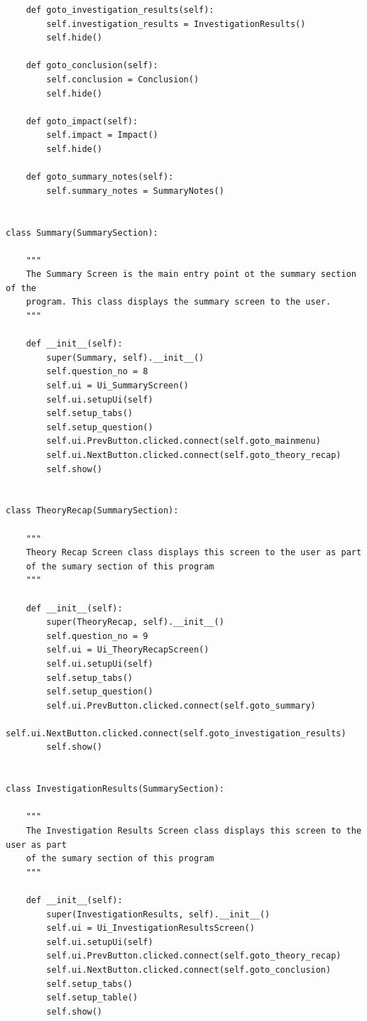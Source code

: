 \documentclass{article}
\begin{document}
\begin{lstlisting}
    def goto_investigation_results(self):
        self.investigation_results = InvestigationResults()
        self.hide()

    def goto_conclusion(self):
        self.conclusion = Conclusion()
        self.hide()

    def goto_impact(self):
        self.impact = Impact()
        self.hide()

    def goto_summary_notes(self):
        self.summary_notes = SummaryNotes()


class Summary(SummarySection):

    """
    The Summary Screen is the main entry point ot the summary section of the
    program. This class displays the summary screen to the user.
    """

    def __init__(self):
        super(Summary, self).__init__()
        self.question_no = 8
        self.ui = Ui_SummaryScreen()
        self.ui.setupUi(self)
        self.setup_tabs()
        self.setup_question()
        self.ui.PrevButton.clicked.connect(self.goto_mainmenu)
        self.ui.NextButton.clicked.connect(self.goto_theory_recap)
        self.show()


class TheoryRecap(SummarySection):

    """
    Theory Recap Screen class displays this screen to the user as part
    of the sumary section of this program
    """

    def __init__(self):
        super(TheoryRecap, self).__init__()
        self.question_no = 9
        self.ui = Ui_TheoryRecapScreen()
        self.ui.setupUi(self)
        self.setup_tabs()
        self.setup_question()
        self.ui.PrevButton.clicked.connect(self.goto_summary)
        self.ui.NextButton.clicked.connect(self.goto_investigation_results)
        self.show()


class InvestigationResults(SummarySection):

    """
    The Investigation Results Screen class displays this screen to the user as part
    of the sumary section of this program
    """

    def __init__(self):
        super(InvestigationResults, self).__init__()
        self.ui = Ui_InvestigationResultsScreen()
        self.ui.setupUi(self)
        self.ui.PrevButton.clicked.connect(self.goto_theory_recap)
        self.ui.NextButton.clicked.connect(self.goto_conclusion)
        self.setup_tabs()
        self.setup_table()
        self.show()


\end{lstlisting}
\end{document}

